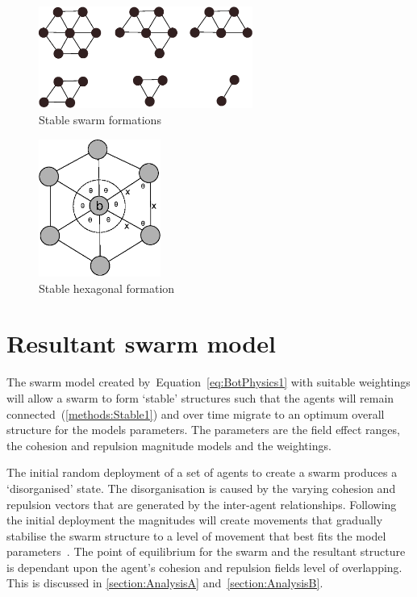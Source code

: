 \begin{figure}[H]
\begin{center}
\includegraphics[width=7cm]{CHAPTER-2/figures/StableForms}
\end{center}
\caption{Stable swarm formations}\label{fig:StableForms}
\end{figure}

\begin{figure}[H]
\begin{center}
\includegraphics[width=4cm]{CHAPTER-2/figures/Hexagon}
\end{center}
\caption{Stable hexagonal formation}\label{fig:StableFormHexagon}
\end{figure}



\section{Resultant swarm model}
The swarm model created by~Equation~\ref{eq:BotPhysics1} with suitable weightings will allow a swarm to form `stable' structures such that the agents will remain connected~(\autoref{methods:Stable1}) and over time migrate to an optimum overall structure for the models parameters. The parameters are the field effect ranges, the cohesion and repulsion magnitude models and the weightings. 

The initial random deployment of a set of agents to create a swarm produces a `disorganised' state. The disorganisation is caused by the varying cohesion and repulsion vectors that are generated by the inter-agent relationships. Following the initial deployment the magnitudes will create movements that gradually stabilise the swarm structure to a level of movement that best fits the model parameters~\cite{PG:08, WF:12}. The point of equilibrium for the swarm and the resultant structure is dependant upon the agent's cohesion and repulsion fields level of overlapping. This is discussed in \autoref{section:AnalysisA} and~\autoref{section:AnalysisB}.


